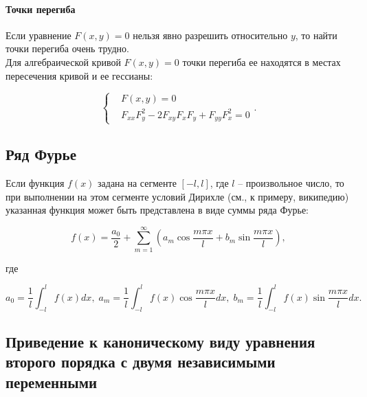 			\paragraph{Точки перегиба}

				Если уравнение $F \left( x, y \right) = 0$ нельзя явно разрешить относительно $y$, то найти точки перегиба очень трудно.\\

				Для алгебраической кривой $F \left( x, y \right) = 0$ точки перегиба ее находятся в местах пересечения кривой и ее гессианы:

				\begin{equation}
					\begin{cases}
						& F \left( x, y \right) = 0\\
						& F_{xx} F^{2}_{y} - 2 F_{xy} F_{x} F_{y} + F_{yy} F^{2}_{x} = 0
					\end{cases}.
				\end{equation}

		\newpage

	\subsection*{Ряд Фурье}

		Если функция $f \left( x \right)$ задана на сегменте $[-l,l]$, где $l$ -- произвольное число, то при выполнении на этом сегменте условий Дирихле (см., к примеру, википедию) указанная функция может быть представлена в виде суммы ряда Фурье:

		\begin{equation}
			f \left( x \right) = \frac{a_{0}}{2} + \sum_{m = 1}^{\infty} \left( a_{m} \cos \frac{m \pi x}{l} + b_{m} \sin \frac{m \pi x}{l} \right),
		\end{equation}

		где

		\begin{equation}
			a_{0} =  \frac{1}{l} \int_{-l}^{l} f \left( x \right) dx, \; a_{m} = \frac{1}{l} \int_{-l}^{l} f \left( x \right) \cos \frac{m \pi x}{l} dx, \; b_{m} = \frac{1}{l} \int_{-l}^{l} f \left( x \right) \sin \frac{m \pi x}{l} dx.
		\end{equation}

		\newpage

	\subsection*{Приведение к каноническому виду уравнения второго порядка с двумя независимыми переменными}

